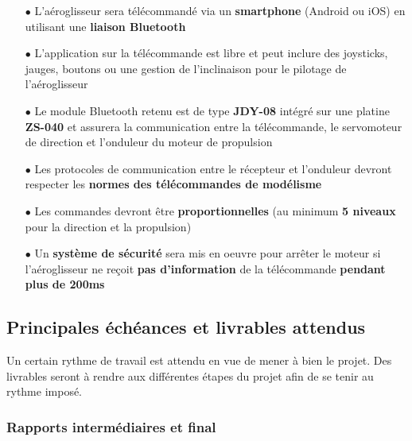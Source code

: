 \documentclass[a4paper,12pt]{report}
\begin{document}
			\begin{itemize}
				\item[$\bullet$] L'aéroglisseur sera télécommandé via un \textbf{smartphone} (Android ou iOS) en utilisant une \textbf{liaison Bluetooth}
				\item[$\bullet$] L'application sur la télécommande est libre et peut inclure des joysticks, jauges, boutons ou une gestion de l'inclinaison pour le pilotage de l'aéroglisseur
				\item[$\bullet$] Le module Bluetooth retenu est de type \textbf{JDY-08} intégré sur une platine \textbf{ZS-040} et assurera la communication entre la télécommande, le servomoteur de direction et l'onduleur du moteur de propulsion
				\item[$\bullet$] Les protocoles de communication entre le récepteur et l'onduleur devront respecter les \textbf{normes des télécommandes de modélisme}
				\item[$\bullet$] Les commandes devront être \textbf{proportionnelles} (au minimum \textbf{5 niveaux} pour la direction et la propulsion)
				\item[$\bullet$] Un \textbf{système de sécurité} sera mis en oeuvre pour arrêter le moteur si l'aéroglisseur ne reçoit \textbf{pas d'information} de la télécommande \textbf{pendant plus de 200ms}
			\end{itemize}
			
			\vspace{-1em}
		
		\subsection{Principales échéances et livrables attendus}
		
		\vspace{-1em}
		
		Un certain rythme de travail est attendu en vue de mener à bien le projet. Des livrables seront à rendre aux différentes étapes du projet afin de se tenir au rythme imposé.
		
			\vspace{-1em}
		
			\subsubsection{Rapports intermédiaires et final}
			
\end{document}
